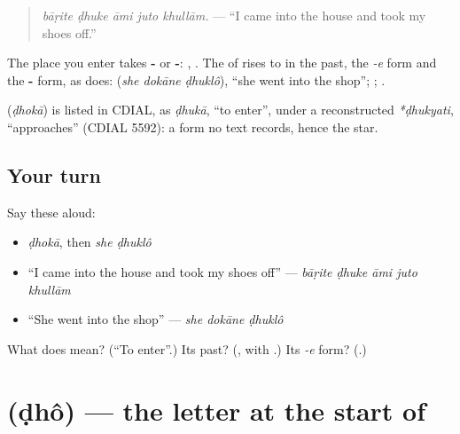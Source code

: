 \begin{quote}
\textbf{    }
\end{quote}

\begin{quote}
\emph{bāṛite ḍhuke āmi juto khullām.} — \textquotedblleft{}I came into the house and took my shoes off.\textquotedblright{}
\end{quote}

The place you enter takes \textbf{-} or \textbf{-}: \textbf{}, \textbf{}. The \textbf{} of \textbf{} rises to \textbf{} in the past, the \emph{-e} form and the \textbf{-} form, as \textbf{} does: \textbf{  } (\emph{she dokāne ḍhuklô}), \textquotedblleft{}she went into the shop\textquotedblright{}; \textbf{}; \textbf{}.

\begin{cousinweb}
\textbf{} (\emph{ḍhokā}) is listed in CDIAL, as \emph{ḍhukā}, \textquotedblleft{}to enter\textquotedblright{}, under a reconstructed \emph{*ḍhukyati}, \textquotedblleft{}approaches\textquotedblright{} (CDIAL 5592): a form no text records, hence the star.
\end{cousinweb}

\subsection*{Your turn}
Say these aloud:

\begin{itemize}
\raggedright
  \item \emph{ḍhokā}, then \emph{she ḍhuklô}
  \item \textquotedblleft{}I came into the house and took my shoes off\textquotedblright{} — \emph{bāṛite ḍhuke āmi juto khullām}
  \item \textquotedblleft{}She went into the shop\textquotedblright{} — \emph{she dokāne ḍhuklô}
\end{itemize}

\begin{tcolorbox}[breakable,colback=teal!4,colframe=teal!35!black,title={Before you move on}]
What does \textbf{} mean? (\textquotedblleft{}To enter\textquotedblright{}.) Its past? (\textbf{}, with \textbf{}.) Its \emph{-e} form? (\textbf{}.)
\end{tcolorbox}
\section[\texorpdfstring{\bn{ঢ} (ḍhô)}{ঢ (ḍhô)}]{ (ḍhô) — the letter at the start of }

